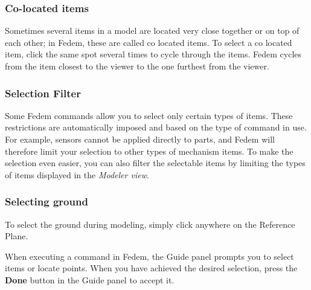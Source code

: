 
\subsubsection{Co-located items}

Sometimes several items in a model are located very close together or
on top of each other; in Fedem, these are called co located items.
To select a co located item, click the same spot several times to
cycle through the items. Fedem cycles from the item closest to the viewer to
the one furthest from the viewer.

\subsubsection{Selection Filter}

Some Fedem commands allow you to select only certain types of items.
These restrictions are automatically imposed and based on the type
of command in use. For example, sensors cannot be applied directly to
parts, and Fedem will therefore limit your selection to other types
of mechanism items. To make the selection even easier, you can also
filter the selectable items by limiting the types of items displayed
in the {\sl Modeler view}.


\subsubsection{Selecting ground}

To select the ground during modeling,
simply click anywhere on the Reference Plane.


When executing a command in Fedem, the Guide panel prompts you to select
items or locate points. When you have achieved the desired selection, press
the \textbf{Done} button in the Guide panel to accept it.


